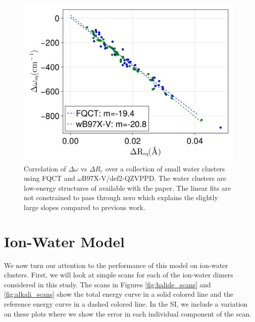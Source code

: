 \documentclass[journal=jctcce,manuscript=article]{achemso}
\begin{document}
\begin{figure}[h]
  \includegraphics*[width=\textwidth]{figures/badger_correlation_final.png}
  \caption{Correlation of $\Delta\omega$ vs $\Delta R_e$ over a collection
  of small water clusters using FQCT and $\omega$B97X-V/def2-QZVPPD.
  The water clusters are low-energy structures of  available
  with the paper. The linear fits are not constrained to pass through zero
  which explains the slightly large slopes compared to previous work.\cite{boyer2019beyond}
}
  \label{fig:badger}
\end{figure}

\section*{Ion-Water Model}

We now turn our attention to the performance of this model on ion-water clusters. First, we will look at simple scans for each of the ion-water dimers considered in this study. The scans in Figures \ref{fig:halide_scans} and \ref{fig:alkali_scans} show the total energy curve in a solid colored line and the reference energy curve in a dashed colored line. In the SI, we include a variation on these plots where we show the error in each individual component of the scan.
\end{document}
